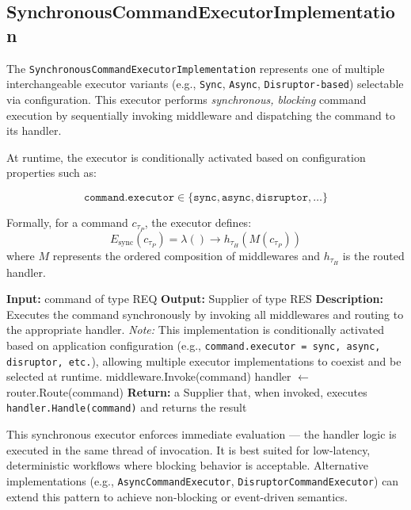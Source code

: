\subsection{SynchronousCommandExecutorImplementation}

The \texttt{SynchronousCommandExecutorImplementation} represents one of multiple interchangeable executor variants 
(e.g., \texttt{Sync}, \texttt{Async}, \texttt{Disruptor-based}) selectable via configuration.  
This executor performs \emph{synchronous, blocking} command execution by sequentially invoking middleware and dispatching the command to its handler.

At runtime, the executor is conditionally activated based on configuration properties such as:

\[
\texttt{command.executor} \in \{ \texttt{sync}, \texttt{async}, \texttt{disruptor}, \ldots \}
\]

Formally, for a command $c_{\tau_P}$, the executor defines:
\[
E_{\text{sync}}(c_{\tau_P}) = \lambda() \rightarrow h_{\tau_H}(M(c_{\tau_P}))
\]
where $M$ represents the ordered composition of middlewares and $h_{\tau_H}$ is the routed handler.

\begin{algorithm}[H]
\caption{SynchronousCommandExecutorImplementation (\emph{Class}) \\ 
One of Multiple Selectable Executors (Sync, Async, etc.) via Configuration Properties}
\begin{algorithmic}[1]

    \State \textbf{Input:} command of type \textlangle REQ\textrangle
    \State \textbf{Output:} Supplier of type \textlangle RES\textrangle
    \State \textbf{Description:} Executes the command synchronously by invoking all middlewares and routing to the appropriate handler.
    \State
    \State \textit{Note:} This implementation is conditionally activated based on application configuration
    (e.g., \texttt{command.executor = sync, async, disruptor, etc.}),
    allowing multiple executor implementations to coexist and be selected at runtime.
    \State
        \State middleware.Invoke(command)
    \EndFor
    \State handler $\gets$ router.Route(command)
    \State \textbf{Return:} a Supplier that, when invoked, executes \texttt{handler.Handle(command)} and returns the result
\EndProcedure

\end{algorithmic}
\end{algorithm}

This synchronous executor enforces immediate evaluation — the handler logic is executed in the same thread of invocation.
It is best suited for low-latency, deterministic workflows where blocking behavior is acceptable.  
Alternative implementations (e.g., \texttt{AsyncCommandExecutor}, \texttt{DisruptorCommandExecutor}) can extend this pattern to achieve non-blocking or event-driven semantics. 